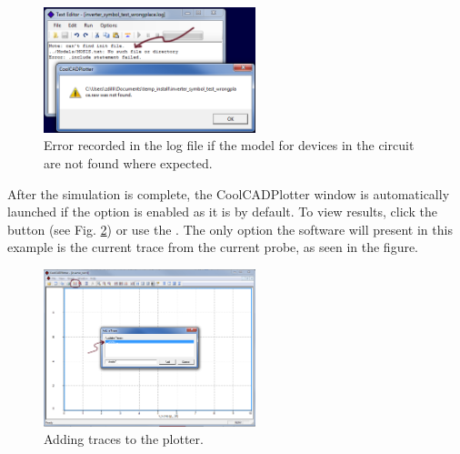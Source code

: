 \begin{figure}
    \includegraphics[width=0.55\textwidth]{./figures/getting_started_figures/SchematicEditor_modelswrongplace.png}
    \caption{Error recorded in the log file if the model for devices in the circuit are not found where expected.}
  \label{fig_schematiceditor_logfileerror}
\end{figure} 

 After the simulation is complete, the CoolCADPlotter window  is automatically launched if the option is enabled as it is by default.  To view results, click the  button (see Fig. \ref{fig_plotter_addingtraces}) or use the .   The only option the software will present in this example is the current trace from the current probe, as seen in the figure.

\begin{figure}
    \includegraphics[width=0.55\textwidth]{./figures/getting_started_figures/Plotter_addingtrace.png}
    \caption{Adding traces to the plotter.}
  \label{fig_plotter_addingtraces}
\end{figure} 


